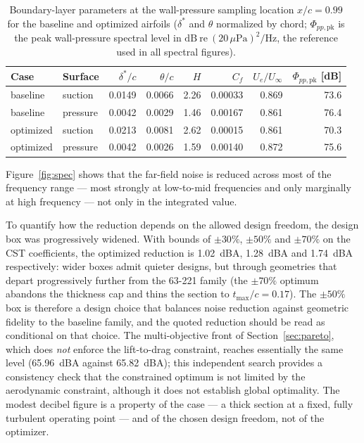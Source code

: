 \documentclass[preprint,3p,times]{elsarticle}
\begin{document}
\begin{table}[!htbp]\centering
\caption{Boundary-layer parameters at the wall-pressure sampling location
$x/c=0.99$ for the baseline and optimized airfoils ($\delta^\ast$ and $\theta$
normalized by chord; $\Phi_{pp,\mathrm{pk}}$ is the peak wall-pressure spectral
level in $\mathrm{dB\ re}\ (20\,\mu\mathrm{Pa})^2/\mathrm{Hz}$, the reference
used in all spectral figures).}
\label{tab:bl}
\begin{tabular}{@{}llrrrrrr@{}}
\toprule
Case & Surface & $\delta^\ast/c$ & $\theta/c$ & $H$ & $C_f$ & $U_e/U_\infty$ & $\Phi_{pp,\mathrm{pk}}$ [dB] \\
\midrule
baseline  & suction  & 0.0149 & 0.0066 & 2.26 & 0.00033 & 0.869 & 73.6 \\
baseline  & pressure & 0.0042 & 0.0029 & 1.46 & 0.00167 & 0.861 & 76.4 \\
optimized & suction  & 0.0213 & 0.0081 & 2.62 & 0.00015 & 0.861 & 70.3 \\
optimized & pressure & 0.0042 & 0.0026 & 1.59 & 0.00140 & 0.872 & 75.6 \\
\bottomrule
\end{tabular}
\end{table}

Figure~\ref{fig:spec} shows that the far-field noise is reduced across most of
the frequency range --- most strongly at low-to-mid frequencies and only
marginally at high frequency --- not only in the integrated value.

To quantify how the reduction depends on the allowed design freedom, the design
box was progressively widened. With bounds of $\pm30\%$, $\pm50\%$ and
$\pm70\%$ on the CST coefficients, the optimized reduction is \SI{1.02}{dBA},
\SI{1.28}{dBA} and \SI{1.74}{dBA} respectively: wider boxes admit quieter
designs, but through geometries that depart progressively further from the
63-221 family (the $\pm70\%$ optimum abandons the thickness cap and thins the
section to $t_{\max}/c=0.17$). The $\pm50\%$ box is therefore a design choice
that balances noise reduction against geometric fidelity to the baseline
family, and the quoted reduction should be read as conditional on that choice.
The multi-objective
front of Section~\ref{sec:pareto}, which does \emph{not} enforce the
lift-to-drag constraint, reaches essentially the same level
(\SI{65.96}{dBA} against \SI{65.82}{dBA}); this independent search provides a
consistency check that the constrained optimum is not limited by the
aerodynamic constraint, although it does not establish global optimality. The modest
decibel figure is a property of the case --- a thick section at a fixed, fully
turbulent operating point --- and of the chosen design freedom, not of the
optimizer.
\end{document}

